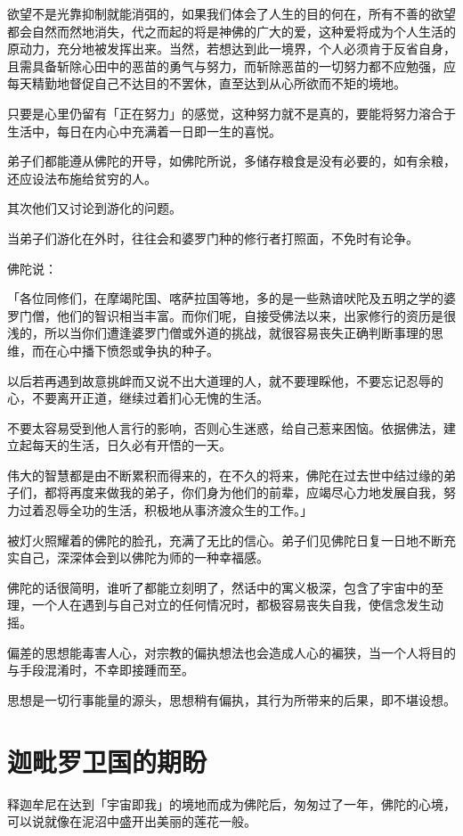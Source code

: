 \documentclass[12pt,twoside,openany]{book}
\begin{document}
欲望不是光靠抑制就能消弭的，如果我们体会了人生的目的何在，所有不善的欲望都会自然而然地消失，代之而起的将是神佛的广大的爱，这种爱将成为个人生活的原动力，充分地被发挥出来。当然，若想达到此一境界，个人必须肯于反省自身，且需具备斩除心田中的恶苗的勇气与努力，而斩除恶苗的一切努力都不应勉强，应每天精勤地督促自己不达目的不罢休，直至达到从心所欲而不矩的境地。

只要是心里仍留有「正在努力」的感觉，这种努力就不是真的，要能将努力溶合于生活中，每日在内心中充满着一日即一生的喜悦。

弟子们都能遵从佛陀的开导，如佛陀所说，多储存粮食是没有必要的，如有余粮，还应设法布施给贫穷的人。

其次他们又讨论到游化的问题。

当弟子们游化在外时，往往会和婆罗门种的修行者打照面，不免时有论争。

佛陀说：

「各位同修们，在摩竭陀国、喀萨拉国等地，多的是一些熟谙吠陀及五明之学的婆罗门僧，他们的智识相当丰富。而你们呢，自接受佛法以来，出家修行的资历是很浅的，所以当你们遭逢婆罗门僧或外道的挑战，就很容易丧失正确判断事理的思维，而在心中播下愤怨或争执的种子。

以后若再遇到故意挑衅而又说不出大道理的人，就不要理睬他，不要忘记忍辱的心，不要离开正道，继续过着扪心无愧的生活。

不要太容易受到他人言行的影响，否则心生迷惑，给自己惹来困恼。依据佛法，建立起每天的生活，日久必有开悟的一天。

伟大的智慧都是由不断累积而得来的，在不久的将来，佛陀在过去世中结过缘的弟子们，都将再度来做我的弟子，你们身为他们的前辈，应竭尽心力地发展自我，努力过着忍辱全功的生活，积极地从事济渡众生的工作。」

被灯火照耀着的佛陀的脸孔，充满了无比的信心。弟子们见佛陀日复一日地不断充实自己，深深体会到以佛陀为师的一种幸福感。

佛陀的话很简明，谁听了都能立刻明了，然话中的寓义极深，包含了宇宙中的至理，一个人在遇到与自己对立的任何情况时，都极容易丧失自我，使信念发生动摇。

偏差的思想能毒害人心，对宗教的偏执想法也会造成人心的褊狭，当一个人将目的与手段混淆时，不幸即接踵而至。

思想是一切行事能量的源头，思想稍有偏执，其行为所带来的后果，即不堪设想。

\section{迦毗罗卫国的期盼}\label{sec3.13}

释迦牟尼在达到「宇宙即我」的境地而成为佛陀后，匆匆过了一年，佛陀的心境，可以说就像在泥沼中盛开出美丽的莲花一般。
\end{document}
